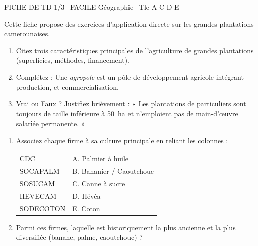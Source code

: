 \documentclass[11pt]{article}
\begin{document}
\begin{tcolorbox}[enhanced,colback=popink,colframe=popink,arc=10pt,boxrule=0pt,left=12pt,right=12pt,top=9pt,bottom=9pt]
{\color{white}\popxbold\small FICHE DE TD 1/3 \textbullet\ FACILE \hfill Géographie \textbullet\ Tle A C D E\par}
\end{tcolorbox}
\vspace{4pt}
Cette fiche propose des exercices d'application directe sur les grandes plantations camerounaises.

\begin{exercice}
\begin{enumerate}
    \item Citez trois caractéristiques principales de l'agriculture de grandes plantations (superficies, méthodes, financement).
    \item Complétez : Une \textit{agropole} est un pôle de développement agricole intégrant production, \underline{\hspace{4cm}} et commercialisation.
    \item Vrai ou Faux ? Justifiez brièvement : « Les plantations de particuliers sont toujours de taille inférieure à \SI{50}{ha} et n'emploient pas de main-d'œuvre salariée permanente. »
\end{enumerate}
\end{exercice}

\begin{exercice}
\begin{enumerate}
    \item Associez chaque firme à sa culture principale en reliant les colonnes :
    \begin{tabular}{ll}
        CDC & \quad A. Palmier à huile \\
        SOCAPALM & \quad B. Bananier / Caoutchouc \\
        SOSUCAM & \quad C. Canne à sucre \\
        HEVECAM & \quad D. Hévéa \\
        SODECOTON & \quad E. Coton \\
    \end{tabular}
    \item Parmi ces firmes, laquelle est historiquement la plus ancienne et la plus diversifiée (banane, palme, caoutchouc) ?
\end{enumerate}
\end{exercice}
\end{document}
